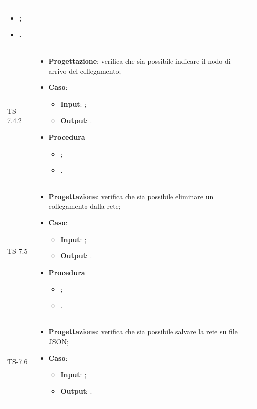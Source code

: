 \begin{longtable}{|C{2.5cm}|C{13cm}|}
\begin{itemize}
	\begin{itemize}
		\item ;
		\item .
	\end{itemize} 
\end{itemize}
	 \\
	\hline
	{TS-7.4.2} &
\begin{itemize}
	\item \textbf{Progettazione}: verifica che sia possibile indicare il nodo
	di arrivo del collegamento;
	\item \textbf{Caso}: 
	\begin{itemize}
		\item \textbf{Input}: ;
		\item \textbf{Output}: .
	\end{itemize}
	\item \textbf{Procedura}:
	\begin{itemize}
		\item ;
		\item .
	\end{itemize} 
\end{itemize}
	  \\
	\hline
	{TS-7.5} &
\begin{itemize}
	\item \textbf{Progettazione}: verifica che sia possibile eliminare un
	collegamento dalla rete;
	\item \textbf{Caso}: 
	\begin{itemize}
		\item \textbf{Input}: ;
		\item \textbf{Output}: .
	\end{itemize}
	\item \textbf{Procedura}:
	\begin{itemize}
		\item ;
		\item .
	\end{itemize} 
\end{itemize}
	  \\
	\hline
	{TS-7.6} & 
\begin{itemize}
	\item \textbf{Progettazione}: verifica che sia possibile salvare la rete su
	file JSON;
	\item \textbf{Caso}: 
	\begin{itemize}
		\item \textbf{Input}: ;
		\item \textbf{Output}: .
	\end{itemize}

\end{itemize}
\end{longtable}
